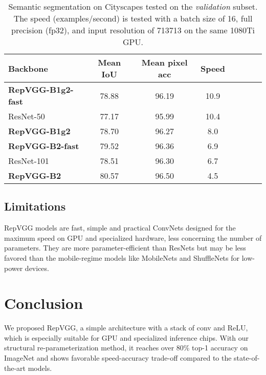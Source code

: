 \documentclass[final]{cvpr}
\begin{document}
\setlength{\tabcolsep}{4pt}
\begin{table}
	\caption{Semantic segmentation on Cityscapes \cite{cityscapes} tested on the \textit{validation} subset. The speed (examples/second) is tested with a batch size of 16, full precision (fp32), and input resolution of 713713 on the same 1080Ti GPU.}
	\label{table-seg}
	\vspace{-0.2in}
	\begin{center}
		\small
		\begin{tabular}{lccccccc}
			\hline
			Backbone		&	Mean IoU			&	Mean pixel acc 	& Speed		\\
			\hline
			\textbf{RepVGG-B1g2-fast}	&	78.88	&	96.19	&	10.9	\\
			ResNet-50					&	77.17	&	95.99	&	10.4	\\
			\textbf{RepVGG-B1g2}		&	78.70	&	96.27	&	8.0	\\
			\hline
			\textbf{RepVGG-B2-fast}		&	79.52	&	96.36	&	6.9	\\
			ResNet-101				&	78.51	&	96.30		&	6.7	\\
			\textbf{RepVGG-B2}		&	80.57	&	96.50		&	4.5 	\\
			\hline
		\end{tabular}
	\end{center}
	\vspace{-0.3in}
\end{table}
\setlength{\tabcolsep}{1.4pt}


\subsection{Limitations}

RepVGG models are fast, simple and practical ConvNets designed for the maximum speed on GPU and specialized hardware, less concerning the number of parameters. They are more parameter-efficient than ResNets but may be less favored than the mobile-regime models like MobileNets \cite{mbv1,mbv2,mbv3} and ShuffleNets \cite{zhang2018shufflenet,ma2018shufflenet} for low-power devices.


\section{Conclusion}

We proposed RepVGG, a simple architecture with a stack of  conv and ReLU, which is especially suitable for GPU and specialized inference chips. With our structural re-parameterization method, it reaches over 80\% top-1 accuracy on ImageNet and shows favorable speed-accuracy trade-off compared to the state-of-the-art models.



{\small


}
\end{document}
